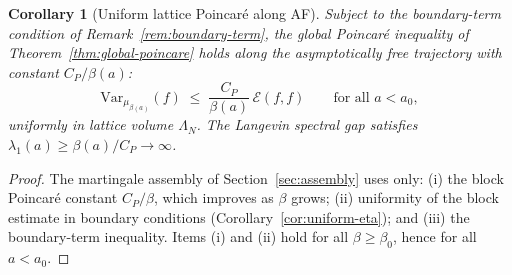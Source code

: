 \documentclass[11pt,a4paper]{article}
\theoremstyle{plain}
\newtheorem{corollary}[theorem]{Corollary}
\theoremstyle{definition}
\theoremstyle{remark}
\newcommand{\Var}{\mathrm{Var}}
\newcommand{\cE}{\mathcal{E}}
\begin{document}
\begin{corollary}[Uniform lattice Poincar\'e along AF]
\label{cor:AF-poincare}
Subject to the boundary-term condition of
Remark~\textup{\ref{rem:boundary-term}}, the global
Poincar\'e inequality of Theorem~\textup{\ref{thm:global-poincare}}
holds along the asymptotically free trajectory with constant
$C_P/\beta(a)$:
\begin{equation}\label{eq:poincare-AF}
\Var_{\mu_{\beta(a)}}(f) \;\leq\;
\frac{C_P}{\beta(a)}\,\cE(f,f)
\qquad\text{for all } a < a_0,
\end{equation}
uniformly in lattice volume $\Lambda_N$.
The Langevin spectral gap satisfies
$\lambda_1(a) \geq \beta(a)/C_P \to \infty$.
\end{corollary}

\begin{proof}
The martingale assembly of Section~\ref{sec:assembly} uses only:
(i) the block Poincar\'e constant $C_P/\beta$, which improves as
$\beta$ grows; (ii) uniformity of the block estimate in boundary
conditions (Corollary~\ref{cor:uniform-eta}); and (iii) the
boundary-term inequality.  Items (i) and (ii) hold for all
$\beta \geq \beta_0$, hence for all $a < a_0$.
\end{proof}
\end{document}
